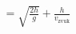 \documentclass[preview]{standalone}
\begin{document}
\begin{align*}
= \sqrt{\frac{2h}{g}} + \frac{h}{v_{\text{zvuk}}}
\end{align*}
\end{document}
